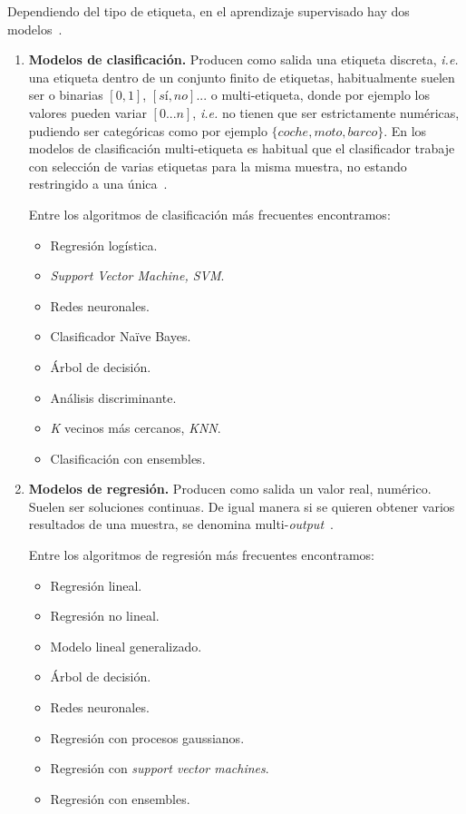 Dependiendo del tipo de etiqueta, en el aprendizaje supervisado hay dos modelos~\cite{supervised_learning_mathworks_inc}.
\begin{enumerate}
	\item \textbf{Modelos de clasificación.} Producen como salida una etiqueta discreta, \textit{i.e.} una etiqueta dentro de un conjunto finito de etiquetas, habitualmente suelen ser o binarias $[0,1]$, $[sí,no]$... o multi-etiqueta, donde por ejemplo los valores pueden variar $[0...n]$, \textit{i.e.} no tienen que ser estrictamente numéricas, pudiendo ser categóricas como por ejemplo $\lbrace coche, moto, barco\rbrace$. En los modelos de clasificación multi-etiqueta es habitual que el clasificador trabaje con selección de varias etiquetas para la misma muestra, no estando restringido a una única~\cite{tsoumakas2007multi}.

Entre los algoritmos de clasificación más frecuentes encontramos:
	\begin{itemize}
	\item Regresión logística.
	\item \textit{Support Vector Machine, SVM}.
	\item Redes neuronales.
	\item Clasificador Naïve Bayes.
	\item Árbol de decisión.
	\item Análisis discriminante.
	\item \textit{K} vecinos más cercanos, \textit{KNN}.
	\item Clasificación con ensembles.
	\end{itemize}
	\item \textbf{Modelos de regresión.} Producen como salida un valor real, numérico. Suelen ser soluciones continuas. De igual manera si se quieren obtener varios resultados de una muestra, se denomina multi-\textit{output}~\cite{borchani2015survey}.
	
	Entre los algoritmos de regresión más frecuentes encontramos:
	\begin{itemize}
	\item Regresión lineal.
	\item Regresión no lineal.
	\item Modelo lineal generalizado.
	\item Árbol de decisión.
	\item Redes neuronales.
	\item Regresión con procesos gaussianos.
	\item Regresión con \textit{support vector machines}.
	\item Regresión con ensembles.
	\end{itemize}
	
\end{enumerate}

